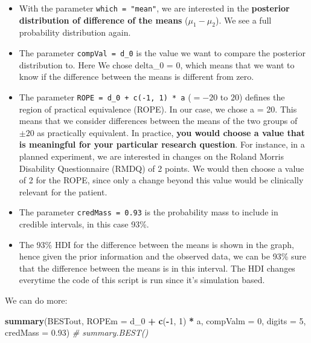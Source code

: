 \documentclass[
]{book}
\newenvironment{Shaded}{\begin{snugshade}}{\end{snugshade}}
\newcommand{\AttributeTok}[1]{\textcolor[rgb]{0.13,0.29,0.53}{#1}}
\newcommand{\CommentTok}[1]{\textcolor[rgb]{0.56,0.35,0.01}{\textit{#1}}}
\newcommand{\DecValTok}[1]{\textcolor[rgb]{0.00,0.00,0.81}{#1}}
\newcommand{\FloatTok}[1]{\textcolor[rgb]{0.00,0.00,0.81}{#1}}
\newcommand{\FunctionTok}[1]{\textcolor[rgb]{0.13,0.29,0.53}{\textbf{#1}}}
\newcommand{\NormalTok}[1]{#1}
\newcommand{\SpecialCharTok}[1]{\textcolor[rgb]{0.81,0.36,0.00}{\textbf{#1}}}
\begin{document}
\begin{itemize}
\item
  With the parameter \texttt{which\ =\ "mean"}, we are interested in the \textbf{posterior distribution of
  difference of the means} (\(\mu_1 - \mu_2\)). We see a full probability distribution again.
\item
  The parameter \texttt{compVal\ =\ d\_0} is the value we want to compare the posterior distribution to. Here We
  chose delta\_0 = 0, which means that we want to know if the difference between the means is
  different from zero.
\item
  The parameter \texttt{ROPE\ =\ d\_0\ +\ c(-1,\ 1)\ *\ a} (\(= -20\) to \(20\)) defines the region of practical equivalence (ROPE).
  In our case, we chose a = 20. This means that we consider differences between the means of the two groups
  of \(\pm 20\) as practically equivalent. In practice, \textbf{you would choose a value that is meaningful for your
  particular research question}. For instance, in a planned experiment, we are interested in changes
  on the Roland Morris Disability Questionnaire (RMDQ) of 2 points.
  We would then choose a value of 2 for the ROPE, since only a change beyond this value would be
  clinically relevant for the patient.
\item
  The parameter \texttt{credMass\ =\ 0.93} is the probability mass to include in credible intervals, in this case 93\%.
\item
  The 93\% HDI for the difference between the means is shown in the graph, hence given
  the prior information and the observed data, we can be 93\% sure that the
  difference between the means is in this interval. The HDI changes everytime the code of this
  script is run since it's simulation based.
\end{itemize}

We can do more:

\begin{Shaded}
\begin{Highlighting}[]
\FunctionTok{summary}\NormalTok{(BESTout, }\AttributeTok{ROPEm =}\NormalTok{ d\_0 }\SpecialCharTok{+} \FunctionTok{c}\NormalTok{(}\SpecialCharTok{{-}}\DecValTok{1}\NormalTok{, }\DecValTok{1}\NormalTok{) }\SpecialCharTok{*}\NormalTok{ a, }\AttributeTok{compValm =} \DecValTok{0}\NormalTok{,}
        \AttributeTok{digits =} \DecValTok{5}\NormalTok{, }\AttributeTok{credMass =} \FloatTok{0.93}\NormalTok{) }\CommentTok{\# summary.BEST()}
\end{Highlighting}
\end{Shaded}
\end{document}
